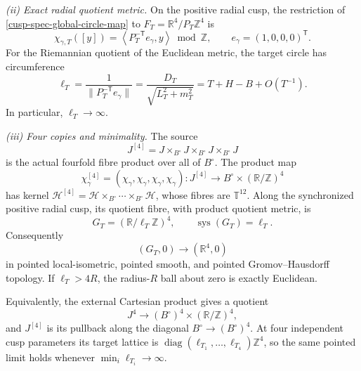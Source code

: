 \begin{theorem}
\smallskip
\noindent
\emph{(ii) Exact radial quotient metric.}
On the positive radial cusp, the restriction of
\cref{cusp-spec-global-circle-map} to
\(F_T=\mathbb R^4/P_T\mathbb Z^4\) is
\begin{equation}
 \chi_{\gamma,T}([y])
 =\left\langle P_T^{-\mathsf T}e_\gamma,y\right\rangle
   \bmod\mathbb Z,\qquad e_\gamma=(1,0,0,0)^{\mathsf T}.
 \label{cusp-spec-radial-circle-character}
\end{equation}
For the Riemannian quotient of the Euclidean metric, the target circle has
circumference
\begin{equation}
 \ell_T
 =\frac1{\lVert P_T^{-\mathsf T}e_\gamma\rVert}
 =\frac{D_T}{\sqrt{L_T^2+m_T^2}}
 =T+H-B+O(T^{-1}).
 \label{cusp-spec-global-circle-circumference}
\end{equation}
In particular, \(\ell_T\to\infty\).

\smallskip
\noindent
\emph{(iii) Four copies and minimality.}
The source
\begin{equation}
 J^{[4]}=J\times_{B^\circ}J\times_{B^\circ}J\times_{B^\circ}J
 \label{cusp-spec-fourfold-fibre-product}
\end{equation}
is the actual fourfold fibre product over all of \(B^\circ\).  The product
map
\begin{equation}
 \chi_\gamma^{[4]}=(\chi_\gamma,\chi_\gamma,\chi_\gamma,\chi_\gamma):
 J^{[4]}\longrightarrow B^\circ\times(\mathbb R/\mathbb Z)^4
 \label{cusp-spec-fourfold-circle-map}
\end{equation}
has kernel
\(\mathcal H^{[4]}=\mathcal H\times_{B^\circ}\cdots
\times_{B^\circ}\mathcal H\), whose fibres are
\(\mathbb T^{12}\).  Along the synchronized positive
radial cusp, its quotient fibre, with product quotient metric, is
\begin{equation}
 G_T=(\mathbb R/\ell_T\mathbb Z)^4,\qquad
 \operatorname{sys}(G_T)=\ell_T.
 \label{cusp-spec-four-circle-fibre}
\end{equation}
Consequently
\begin{equation}
 (G_T,0)\longrightarrow(\mathbb R^4,0)
 \label{cusp-spec-four-circle-limit}
\end{equation}
in pointed local-isometric, pointed smooth, and pointed
Gromov--Hausdorff topology.  If \(\ell_T>4R\), the radius-\(R\) ball
about zero is exactly Euclidean.

Equivalently, the external Cartesian product gives a quotient
\[
 J^4\longrightarrow(B^\circ)^4\times(\mathbb R/\mathbb Z)^4,
\]
and \(J^{[4]}\) is its pullback along the diagonal
\(B^\circ\to(B^\circ)^4\).  At four independent cusp parameters its target
lattice is
\(\operatorname{diag}(\ell_{T_1},\ldots,\ell_{T_4})\mathbb Z^4\), so the
same pointed limit holds whenever
\(\min_i\ell_{T_i}\to\infty\).


\end{theorem}

